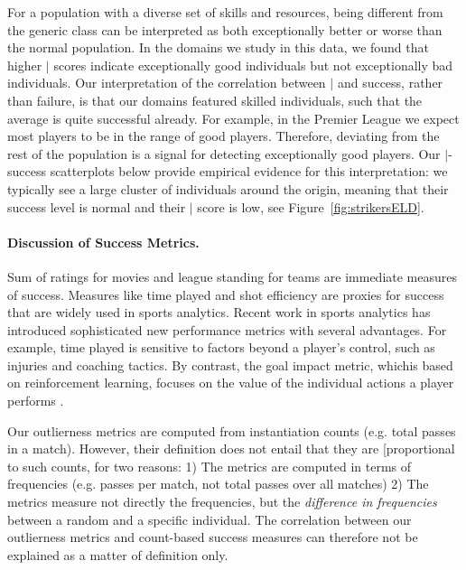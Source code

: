 {For a population with a diverse set of skills and resources,
being different from the generic class can be interpreted as both exceptionally better or worse than the normal population. In the domains we study in this data, we found that higher $\mid$ scores indicate exceptionally good individuals but not exceptionally bad individuals. Our interpretation of the correlation between $\mid$ and success, rather than failure, is that our domains featured skilled individuals, such that the average is quite successful already. 
For example, in the Premier League we expect most players to be in the range of good players. Therefore, deviating from the rest of the population is a signal for detecting exceptionally good players. Our $\mid$-success scatterplots below provide empirical evidence for this interpretation: we typically see a large cluster of individuals around the origin, meaning that their success level is normal and their $\mid$ score is low, see Figure~\ref{fig:strikersELD}. %

\paragraph{Discussion of Success Metrics.}
Sum of ratings for movies and league standing for teams are immediate measures of success. Measures like time played and shot efficiency are proxies for success that are widely used in sports analytics. 
Recent work in sports analytics has introduced sophisticated new performance metrics with several advantages. For example, time played is sensitive to factors beyond a player's control, such as injuries and coaching tactics.  By contrast, the goal impact metric, whichis based on reinforcement learning, focuses on the value of the individual actions a player performs \citep{Routley2015a,Liu2018}. 

Our outlierness metrics are computed from instantiation counts (e.g. total passes in a match). However, their definition does not entail that they are [proportional to such counts, for two reasons: 
1) The metrics are computed in terms of frequencies (e.g. passes per match, not total passes over all matches) 2) The metrics measure not directly the frequencies, but the {\em difference in frequencies} between a random and a specific individual.  The correlation between our outlierness metrics and count-based success measures can therefore not be explained as a matter of definition only.




}
